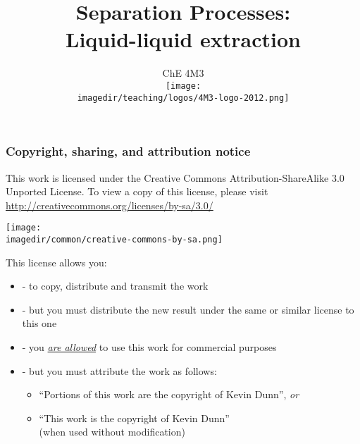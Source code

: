\documentclass[handout, 11pt]{beamer}
\title[]{\LARGE Separation Processes:\\ {\textbf{Liquid-liquid extraction}}}
\subtitle[]{\Large ChE 4M3 \\ \vspace{0.5cm} \texttt{[image: \\imagedir/teaching/logos/4M3-logo-2012.png]} \vspace{-1.5cm} }\author[]{}
\institute[]{}
\date[]{\copyright~ Kevin Dunn, \today \\ \vspace{0.2cm}{\footnotesize {\tt kevin.dunn@mcmaster.ca}\\ \href{http://learnche.mcmaster.ca/4M3}{http://learnche.mcmaster.ca/4M3}\\ \vspace{1cm}}

{\footnotesize Overall revision number: \hgversion (\monthname~\THEYEAR)} %
}
\begin{document}
	
\begin{frame} \titlepage \end{frame}

\begin{frame}\frametitle{Copyright, sharing, and attribution notice}

	{\footnotesize This work is licensed under the Creative Commons Attribution-ShareAlike 3.0 Unported License. To view a copy of this license, 
	please visit \href{http://creativecommons.org/licenses/by-sa/3.0/}{http://creativecommons.org/licenses/by-sa/3.0/}}
	\vspace{-1.0cm}
	\begin{flushright}
		\texttt{[image: \\imagedir/common/creative-commons-by-sa.png]}
	\end{flushright}	
	\vspace{-0.2cm}
	\begin{exampleblock}{}
		{\small This license allows you: }
		\begin{itemize}
			\item	{} - to copy, distribute and transmit the work
			\item	{} - but you must distribute the new result under the same or similar license to this one
			\item	{} - you \underline{\emph{are allowed}} to use this work for commercial purposes 
			\item	{} - but you must attribute the work as follows:
			\begin{itemize}
				\item	``Portions of this work are the copyright of Kevin Dunn'', \emph{or}
				\item	``This work is the copyright of Kevin Dunn'' \\{\tiny (when used without modification)}
			\end{itemize} 
		\end{itemize}
	\end{exampleblock}
\end{frame}
\end{document}
